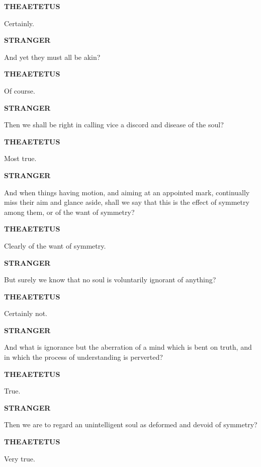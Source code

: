 \documentclass[11pt,letter]{article}
\begin{document}
\par \textbf{THEAETETUS}
\par   Certainly.

\par \textbf{STRANGER}
\par   And yet they must all be akin?

\par \textbf{THEAETETUS}
\par   Of course.

\par \textbf{STRANGER}
\par   Then we shall be right in calling vice a discord and disease of the soul?

\par \textbf{THEAETETUS}
\par   Most true.

\par \textbf{STRANGER}
\par   And when things having motion, and aiming at an appointed mark, continually miss their aim and glance aside, shall we say that this is the effect of symmetry among them, or of the want of symmetry?

\par \textbf{THEAETETUS}
\par   Clearly of the want of symmetry.

\par \textbf{STRANGER}
\par   But surely we know that no soul is voluntarily ignorant of anything?

\par \textbf{THEAETETUS}
\par   Certainly not.

\par \textbf{STRANGER}
\par   And what is ignorance but the aberration of a mind which is bent on truth, and in which the process of understanding is perverted?

\par \textbf{THEAETETUS}
\par   True.

\par \textbf{STRANGER}
\par   Then we are to regard an unintelligent soul as deformed and devoid of symmetry?

\par \textbf{THEAETETUS}
\par   Very true.
\end{document}
